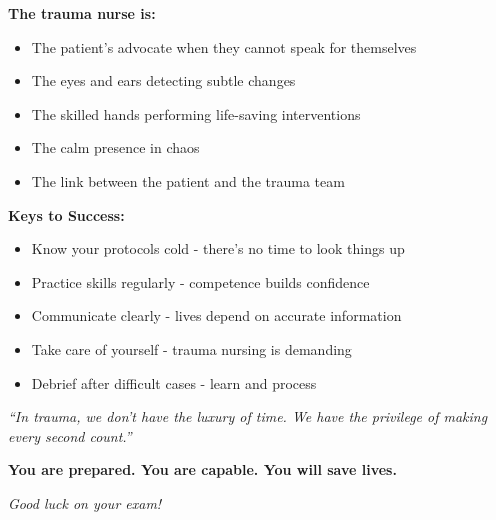 \documentclass[11pt]{article}
\begin{document}
\begin{tcolorbox}[colback=green!5!white,colframe=green!75!black,title=\textbf{NURSING EXCELLENCE IN TRAUMA CARE}]

\textbf{The trauma nurse is:}
\begin{itemize}
    \item The patient's advocate when they cannot speak for themselves
    \item The eyes and ears detecting subtle changes
    \item The skilled hands performing life-saving interventions
    \item The calm presence in chaos
    \item The link between the patient and the trauma team
\end{itemize}

\vspace{0.3cm}

\textbf{Keys to Success:}
\begin{itemize}
    \item Know your protocols cold - there's no time to look things up
    \item Practice skills regularly - competence builds confidence
    \item Communicate clearly - lives depend on accurate information
    \item Take care of yourself - trauma nursing is demanding
    \item Debrief after difficult cases - learn and process
\end{itemize}

\vspace{0.3cm}

\textit{``In trauma, we don't have the luxury of time. We have the privilege of making every second count.''}

\end{tcolorbox}

\vspace{1cm}

\begin{center}
\textbf{\Large You are prepared. You are capable. You will save lives.}

\vspace{0.5cm}

\textit{Good luck on your exam!}
\end{center}
\end{document}
